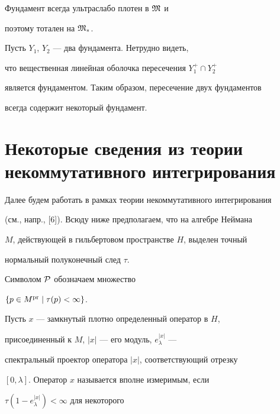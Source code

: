 \begin{note}


Фундамент всегда ультраслабо плотен в $\frak M$ и 


поэтому тотален на ${\frak M}_*$.


\end{note}





\begin{note} Пусть $Y_1$, $Y_2$ --- два фундамента. Нетрудно видеть, 


что вещественная линейная оболочка пересечения $Y_1^+ \cap Y_2^+$ 


является фундаментом. Таким образом, пересечение двух фундаментов 


всегда содержит некоторый фундамент. 


\end{note}





\section{Некоторые сведения из теории некоммутативного интегрирования}





Далее будем работать в рамках теории некоммутативного интегрирования 


(см., напр., [6]). Всюду ниже предполагаем, что на алгебре Неймана 


$M$, действующей в гильбертовом пространстве $H$, выделен точный 


нормальный полуконечный след $\tau $.  


Символом ${\cal P}$ обозначаем множество


$\{ p \in M^{\operatorname{pr}} \mid \tau (p) < \infty \}$. 





Пусть $x$ --- замкнутый плотно определенный оператор в $H$, 


присоединенный к $M$, $|x|$ --- его модуль, $e_{\lambda}^{|x|}$ ---


спектральный проектор оператора $|x|$, соответствующий отрезку 


$[0, \lambda]$. Оператор $x$ называется вполне измеримым, если 


$\tau (1 - e_{\lambda}^{|x|}) < \infty $ для некоторого 


